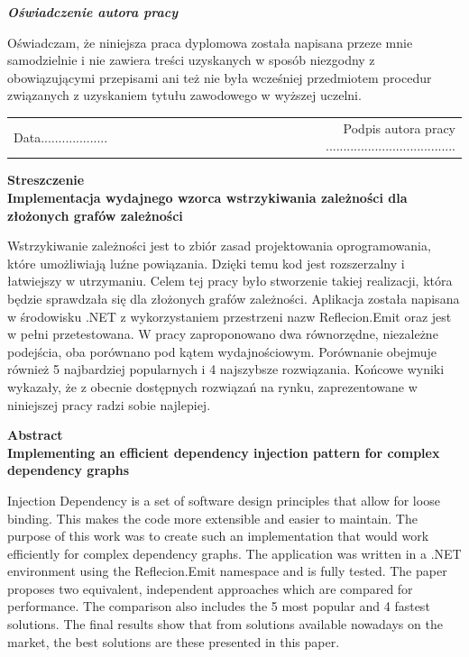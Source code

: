 \documentclass[12pt]{article}
\begin{document}
\vspace{150pt}

\begin{center}
\textbf{\emph{Oświadczenie autora pracy}}\\
\end{center}
Oświadczam, że niniejsza praca dyplomowa została napisana przeze mnie samodzielnie i nie zawiera treści uzyskanych w sposób niezgodny z obowiązującymi przepisami ani też nie była wcześniej przedmiotem procedur związanych z uzyskaniem tytułu zawodowego w wyższej uczelni.\\

\vspace{54pt}

\begin{tabular}{lccccccccr}
Data................... & & & & & & & & & Podpis autora pracy ..................................... \\
\end{tabular}


\clearpage
\begin{center}
\textbf{Streszczenie}\\
\vspace{16pt}
\textbf{Implementacja wydajnego wzorca wstrzykiwania zależności dla złożonych grafów zależności}
\end{center}
Wstrzykiwanie zależności jest to zbiór zasad projektowania oprogramowania, które umożliwiają luźne powiązania. Dzięki temu kod jest rozszerzalny i łatwiejszy w utrzymaniu. Celem tej pracy było stworzenie takiej realizacji, która będzie sprawdzała się dla złożonych grafów zależności. Aplikacja została napisana w środowisku .NET z wykorzystaniem przestrzeni nazw Reflecion.Emit oraz jest w pełni przetestowana. W pracy zaproponowano dwa równorzędne, niezależne podejścia, oba porównano pod kątem wydajnościowym. Porównanie obejmuje również 5 najbardziej popularnych i 4 najszybsze rozwiązania. Końcowe wyniki wykazały, że z obecnie dostępnych rozwiązań na rynku, zaprezentowane w niniejszej pracy radzi sobie najlepiej.

\clearpage
\begin{center}
\textbf{Abstract}\\
\vspace{16pt}
\textbf{Implementing an efficient dependency injection pattern for complex dependency graphs}
\end{center}
Injection Dependency is a set of software design principles that allow for loose binding. This makes the code more extensible and easier to maintain. The purpose of this work was to create such an implementation that would work efficiently for complex dependency graphs. The application was written in a .NET environment using the Reflecion.Emit namespace and is fully tested. The paper proposes two equivalent, independent approaches which are compared for performance. The comparison also includes the 5 most popular and 4 fastest solutions. The final results show that from solutions available nowadays on the market, the best solutions are these presented in this paper.
\end{document}
